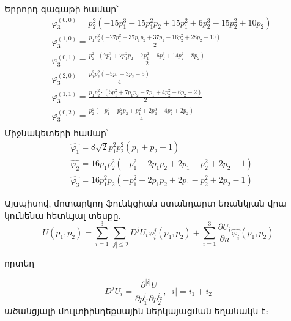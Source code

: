 \documentclass[fleqn, bachelor,subf,12pt,notitlepage]{article}
\begin{document}
Երրորդ գագաթի համար՝
\begin{equation}
\begin{aligned}
&\varphi_{3}^{(0,0)}=p_{2}^{2} \left(- 15 p_{1}^{3} - 15 p_{1}^{2} p_{2} + 15 p_{1}^{2} + 6 p_{2}^{3} - 15 p_{2}^{2} + 10 p_{2}\right) \\
&\varphi_{3}^{(1,0)}=\frac{p_{1} p_{2}^{2} \left(- 27 p_{1}^{2} - 37 p_{1} p_{2} + 37 p_{1} - 16 p_{2}^{2} + 28 p_{2} - 10\right)}{2} \\
&\varphi_{3}^{(0,1)}=\frac{p_{2}^{2} \cdot \left(7 p_{1}^{3} + 7 p_{1}^{2} p_{2} - 7 p_{1}^{2} - 6 p_{2}^{3} + 14 p_{2}^{2} - 8 p_{2}\right)}{2} \\
&\varphi_{3}^{(2,0)}=\frac{p_{1}^{2} p_{2}^{2} \left(- 5 p_{1} - 3 p_{2} + 5\right)}{4} \\
&\varphi_{3}^{(1,1)}=\frac{p_{1} p_{2}^{2} \cdot \left(5 p_{1}^{2} + 7 p_{1} p_{2} - 7 p_{1} + 4 p_{2}^{2} - 6 p_{2} + 2\right)}{2} \\
&\varphi_{3}^{(0,2)}=\frac{p_{2}^{2} \left(- p_{1}^{3} - p_{1}^{2} p_{2} + p_{1}^{2} + 2 p_{2}^{3} - 4 p_{2}^{2} + 2 p_{2}\right)}{4} \\
\end{aligned}
\end{equation}
Միջնակետերի համար՝
\begin{equation}
\begin{aligned}
&\hat{\varphi_{1}}=8 \sqrt{2} p_{1}^{2} p_{2}^{2} \left(p_{1} + p_{2} - 1\right) \\
&\hat{\varphi_{2}}=16 p_{1} p_{2}^{2} \left(- p_{1}^{2} - 2 p_{1} p_{2} + 2 p_{1} - p_{2}^{2} + 2 p_{2} - 1\right) \\
&\hat{\varphi_{3}}=16 p_{1}^{2} p_{2} \left(- p_{1}^{2} - 2 p_{1} p_{2} + 2 p_{1} - p_{2}^{2} + 2 p_{2} - 1\right)
\end{aligned}
\end{equation}

Այսպիսով, մոտարկող ֆունկցիան ստանդարտ եռանկյան վրա կունենա հետևյալ տեսքը.
\begin{equation}
U\left(p_{1}, p_{2}\right) = \sum_{i=1}^{3}\sum_{|j|\leq 2}D^{j}U_{i} \varphi_{i}^{j} \left(p_{1}, p_{2}\right) + \sum_{i=1}^{3} \dfrac{\partial U_{i}}{\partial n}\hat{\varphi_{i}}\left(p_{1}, p_{2}\right)
\end{equation}

որտեղ 

$$D^{j}U_{i} = \dfrac{\partial^{|i|}U}{\partial p_{1}^{i_{1}} \partial p_{2}^{i_{2}}}, \; \left|i\right| = i_{1}+i_{2}$$
ածանցյալի մուլտիինդեքսային ներկայացման եղանակն է։
\end{document}
